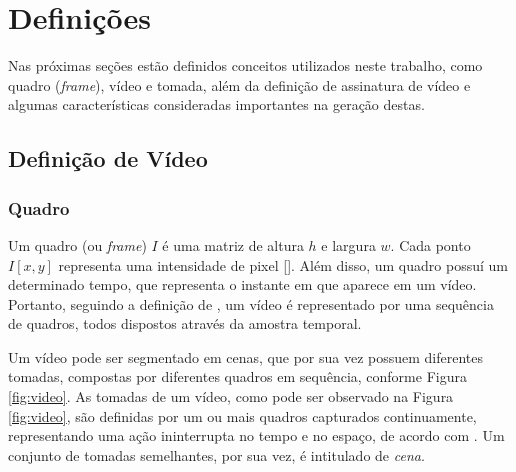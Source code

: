 



\chapter{Definições}
\label{chap:definicoes}

	Nas próximas seções estão definidos conceitos utilizados neste trabalho, como quadro (\textit{frame}), vídeo e tomada, além da definição de assinatura de vídeo e algumas características consideradas importantes na geração destas. 
    
  	\section{Definição de Vídeo}
    \label{sec:video}
    
    \subsection{Quadro}
    \label{subsec:quadro}
    Um quadro (ou \textit{frame}) $I$ é uma matriz de altura $h$ e largura $w$. Cada ponto $I[x,y]$ representa uma intensidade de pixel [\citeauthor{simoes2004detecccao}]. Além disso, um quadro possuí um determinado tempo, que representa o instante em que aparece em um vídeo. Portanto, seguindo a definição de \citeauthor{simoes2004detecccao}, um vídeo é representado por uma sequência de quadros, todos dispostos através da amostra temporal.
      
    Um vídeo pode ser segmentado em cenas, que por sua vez possuem diferentes tomadas, compostas por diferentes quadros em sequência, conforme Figura \ref{fig:video}. As tomadas de um vídeo, como pode ser observado na Figura \ref{fig:video}, são definidas por um ou mais quadros capturados continuamente, representando uma ação ininterrupta no tempo e no espaço, de acordo com \citeauthor{davenport1991cinematic}. Um conjunto de tomadas semelhantes, por sua vez, é intitulado de \textit{cena}.
    
